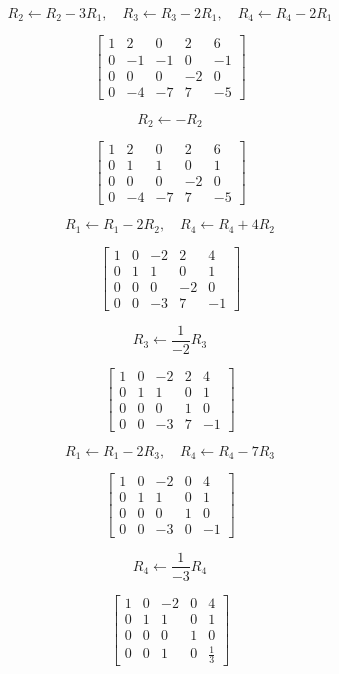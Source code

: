 \documentclass[12pt]{article}
\begin{document}
\begin{enumerate}
\[
R_2 \leftarrow R_2 - 3R_1,\quad
R_3 \leftarrow R_3 - 2R_1,\quad
R_4 \leftarrow R_4 - 2R_1
\]

\[
\left[
\begin{array}{rrrr|r}
1 & 2 & 0 & 2 & 6 \\
0 & -1 & -1 & 0 & -1 \\
0 & 0 & 0 & -2 & 0 \\
0 & -4 & -7 & 7 & -5
\end{array}
\right]
\]

\[
R_2 \leftarrow -R_2
\]

\[
\left[
\begin{array}{rrrr|r}
1 & 2 & 0 & 2 & 6 \\
0 & 1 & 1 & 0 & 1 \\
0 & 0 & 0 & -2 & 0 \\
0 & -4 & -7 & 7 & -5
\end{array}
\right]
\]

\[
R_1 \leftarrow R_1 - 2R_2,\quad
R_4 \leftarrow R_4 + 4R_2
\]

\[
\left[
\begin{array}{rrrr|r}
1 & 0 & -2 & 2 & 4 \\
0 & 1 & 1 & 0 & 1 \\
0 & 0 & 0 & -2 & 0 \\
0 & 0 & -3 & 7 & -1
\end{array}
\right]
\]

\[
R_3 \leftarrow \frac{1}{-2} R_3
\]

\[
\left[
\begin{array}{rrrr|r}
1 & 0 & -2 & 2 & 4 \\
0 & 1 & 1 & 0 & 1 \\
0 & 0 & 0 & 1 & 0 \\
0 & 0 & -3 & 7 & -1
\end{array}
\right]
\]

\[
R_1 \leftarrow R_1 - 2R_3,\quad
R_4 \leftarrow R_4 - 7R_3
\]

\[
\left[
\begin{array}{rrrr|r}
1 & 0 & -2 & 0 & 4 \\
0 & 1 & 1 & 0 & 1 \\
0 & 0 & 0 & 1 & 0 \\
0 & 0 & -3 & 0 & -1
\end{array}
\right]
\]

\[
R_4 \leftarrow \frac{1}{-3} R_4
\]

\[
\left[
\begin{array}{rrrr|r}
1 & 0 & -2 & 0 & 4 \\
0 & 1 & 1 & 0 & 1 \\
0 & 0 & 0 & 1 & 0 \\
0 & 0 & 1 & 0 & \frac{1}{3}
\end{array}
\right]
\]


\end{enumerate}
\end{document}
